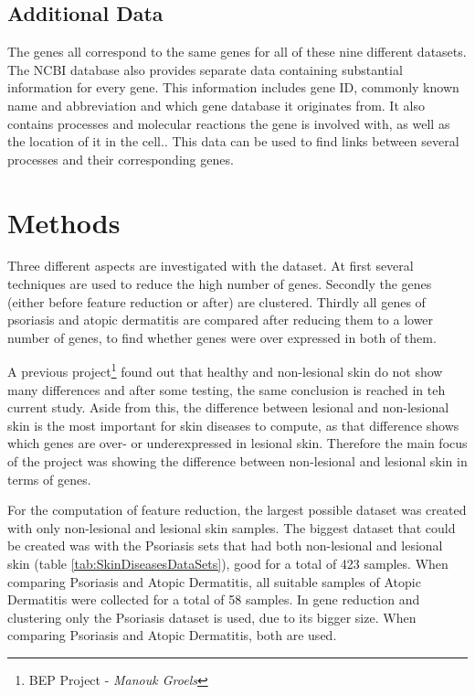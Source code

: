 \documentclass[10pt,a4paper]{article}
\begin{document}
	\subsection{Additional Data}
	\label{subsec:AdditionalData}
	
	The genes all correspond to the same genes for all of these nine different datasets. The NCBI database\cite{edgar2002gene} also provides separate data containing substantial information for every gene. This information includes gene ID, commonly known name and abbreviation and which gene database it originates from. It also contains processes and molecular reactions the gene is involved with, as well as the location of it in the cell.. This data can be used to find links between several processes and their corresponding genes.
	
	\section{Methods}
	\label{sec:Methods}
	
	Three different aspects are investigated with the dataset. At first several techniques are used to reduce the high number of genes. Secondly the genes (either before feature reduction or after) are clustered. Thirdly all genes of psoriasis and atopic dermatitis are compared after reducing them to a lower number of genes, to find whether genes were over expressed in both of them.
	
	A previous project\footnote{BEP Project -\textit{ Manouk Groels}} found out that healthy and non-lesional skin do not show many differences and after some testing, the same conclusion is reached in teh current study. Aside from this, the difference between lesional and non-lesional skin is the most important for skin diseases to compute, as that difference shows which genes are over- or underexpressed in lesional skin. Therefore the main focus of the project was showing the difference between non-lesional and lesional skin in terms of genes. 
	
	For the computation of feature reduction, the largest possible dataset was created with only non-lesional and lesional skin samples. The biggest dataset that could be created was with the Psoriasis sets that had both non-lesional and lesional skin (table \ref{tab:SkinDiseasesDataSets}), good for a total of 423 samples. When comparing Psoriasis and Atopic Dermatitis, all suitable samples of Atopic Dermatitis were collected for a total of 58 samples. In gene reduction and clustering only the Psoriasis dataset is used, due to its bigger size. When comparing Psoriasis and Atopic Dermatitis, both are used.
	
\end{document}
